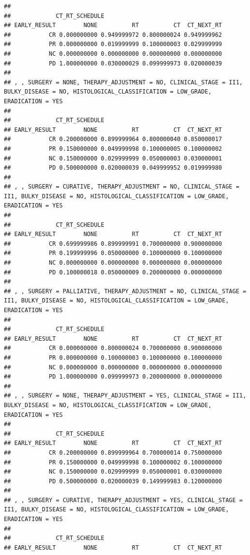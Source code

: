 \documentclass[]{article}
\begin{document}
\begin{verbatim}
## 
##             CT_RT_SCHEDULE
## EARLY_RESULT        NONE          RT          CT  CT_NEXT_RT
##           CR 0.000000000 0.949999972 0.800000024 0.949999962
##           PR 0.000000000 0.019999999 0.100000003 0.029999999
##           NC 0.000000000 0.000000000 0.000000000 0.000000000
##           PD 1.000000000 0.030000029 0.099999973 0.020000039
## 
## , , SURGERY = NONE, THERAPY_ADJUSTMENT = NO, CLINICAL_STAGE = II1, BULKY_DISEASE = NO, HISTOLOGICAL_CLASSIFICATION = LOW_GRADE, ERADICATION = YES
## 
##             CT_RT_SCHEDULE
## EARLY_RESULT        NONE          RT          CT  CT_NEXT_RT
##           CR 0.200000000 0.899999964 0.800000040 0.850000017
##           PR 0.150000000 0.049999998 0.100000005 0.100000002
##           NC 0.150000000 0.029999999 0.050000003 0.030000001
##           PD 0.500000000 0.020000039 0.049999952 0.019999980
## 
## , , SURGERY = CURATIVE, THERAPY_ADJUSTMENT = NO, CLINICAL_STAGE = II1, BULKY_DISEASE = NO, HISTOLOGICAL_CLASSIFICATION = LOW_GRADE, ERADICATION = YES
## 
##             CT_RT_SCHEDULE
## EARLY_RESULT        NONE          RT          CT  CT_NEXT_RT
##           CR 0.699999986 0.899999991 0.700000000 0.900000000
##           PR 0.199999996 0.050000000 0.100000000 0.100000000
##           NC 0.000000000 0.000000000 0.000000000 0.000000000
##           PD 0.100000018 0.050000009 0.200000000 0.000000000
## 
## , , SURGERY = PALLIATIVE, THERAPY_ADJUSTMENT = NO, CLINICAL_STAGE = II1, BULKY_DISEASE = NO, HISTOLOGICAL_CLASSIFICATION = LOW_GRADE, ERADICATION = YES
## 
##             CT_RT_SCHEDULE
## EARLY_RESULT        NONE          RT          CT  CT_NEXT_RT
##           CR 0.000000000 0.800000024 0.700000000 0.900000000
##           PR 0.000000000 0.100000003 0.100000000 0.100000000
##           NC 0.000000000 0.000000000 0.000000000 0.000000000
##           PD 1.000000000 0.099999973 0.200000000 0.000000000
## 
## , , SURGERY = NONE, THERAPY_ADJUSTMENT = YES, CLINICAL_STAGE = II1, BULKY_DISEASE = NO, HISTOLOGICAL_CLASSIFICATION = LOW_GRADE, ERADICATION = YES
## 
##             CT_RT_SCHEDULE
## EARLY_RESULT        NONE          RT          CT  CT_NEXT_RT
##           CR 0.200000000 0.899999964 0.700000014 0.750000000
##           PR 0.150000000 0.049999998 0.100000002 0.100000000
##           NC 0.150000000 0.029999999 0.050000001 0.030000000
##           PD 0.500000000 0.020000039 0.149999983 0.120000000
## 
## , , SURGERY = CURATIVE, THERAPY_ADJUSTMENT = YES, CLINICAL_STAGE = II1, BULKY_DISEASE = NO, HISTOLOGICAL_CLASSIFICATION = LOW_GRADE, ERADICATION = YES
## 
##             CT_RT_SCHEDULE
## EARLY_RESULT        NONE          RT          CT  CT_NEXT_RT

\end{verbatim}
\end{document}

